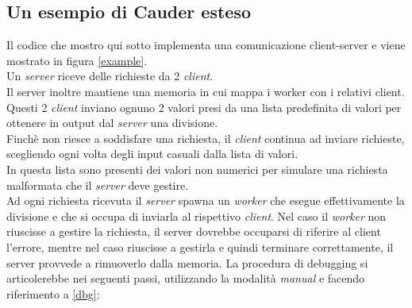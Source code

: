 \documentclass[Contributo.tex]{subfiles}
\begin{document}
\subsection{Un esempio di Cauder esteso}
Il codice che mostro qui sotto implementa una comunicazione client-server e viene mostrato in figura \ref{example}.\\
Un \textit{server} riceve delle richieste da 2 \textit{client}.\\
Il server inoltre mantiene una memoria in cui mappa i worker con i relativi client.\\
Questi 2 \textit{client} inviano ognuno 2 valori presi da una lista predefinita di valori per ottenere in output dal \textit{server} una divisione.\\
Finchè non riesce a soddisfare una richiesta, il \textit{client} continua ad inviare richieste, scegliendo ogni volta degli input casuali dalla lista di valori.\\
In questa lista sono presenti dei valori non numerici per simulare una richiesta malformata che il \textit{server} deve gestire.\\
Ad ogni richiesta ricevuta il \textit{server} spawna un \textit{worker} che esegue effettivamente la divisione e che si occupa di inviarla al rispettivo \textit{client}.
Nel caso il \textit{worker} non riuscisse a gestire la richiesta, il server dovrebbe occuparsi di riferire al client l'errore, mentre nel caso riuscisse a gestirla e quindi terminare correttamente, il server provvede a rimuoverlo dalla memoria.
La procedura di debugging si articolerebbe nei seguenti passi, utilizzando la modalità \textit{manual} e facendo riferimento a \ref{dbg}:
\end{document}

